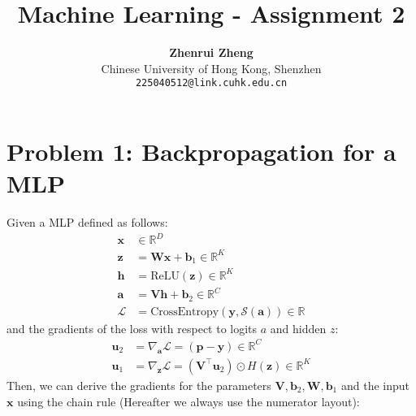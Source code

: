 \documentclass[11pt, a4paper, oneside]{memoir}
\title{\huge\textbf{Machine Learning - Assignment 2}\vspace{-0.5cm}}
\author{\textbf{Zhenrui Zheng} \vspace{0.5cm} \\ \small Chinese University of Hong Kong, Shenzhen \\ \small\texttt{225040512@link.cuhk.edu.cn}}
\date{}
\begin{document}
\begin{titlingpage}
    \maketitle
    \renewcommand{\contentsname}{\huge Contents \vspace{-1cm}}
    \begin{KeepFromToc} %
        \tableofcontents
    \end{KeepFromToc}
\end{titlingpage}

\chapter{Problem 1: Backpropagation for a MLP}
Given a MLP defined as follows:
\begin{align*}
    \boldsymbol{x} & \in \mathbb{R}^D                                                                  \\
    \boldsymbol{z} & = \mathbf{W}\boldsymbol{x} + \boldsymbol{b}_1 \in \mathbb{R}^K                    \\
    \boldsymbol{h} & = \text{ReLU}(\boldsymbol{z}) \in \mathbb{R}^K                                    \\
    \boldsymbol{a} & = \mathbf{V}\boldsymbol{h} + \boldsymbol{b}_2 \in \mathbb{R}^C                    \\
    \mathcal{L}    & = \text{CrossEntropy}(\boldsymbol{y}, \mathcal{S}(\boldsymbol{a})) \in \mathbb{R}
\end{align*}
and the gradients of the loss with respect to logits $a$ and hidden $z$:
\begin{align*}
    \boldsymbol{u}_2 & = \nabla_{\boldsymbol{a}} \mathcal{L} = (\boldsymbol{p}-\boldsymbol{y}) \in \mathbb{R}^C                         \\
    \boldsymbol{u}_1 & = \nabla_{\boldsymbol{z}} \mathcal{L} = (\mathbf{V}^\top \boldsymbol{u}_2) \odot H(\boldsymbol{z}) \in \mathbb{R}^K
\end{align*}
Then, we can derive the gradients for the parameters $\mathbf{V}, \boldsymbol{b}_2, \mathbf{W}, \boldsymbol{b}_1$
and the input $\boldsymbol{x}$ using the chain rule (Hereafter we always use the numerator layout):
\end{document}
